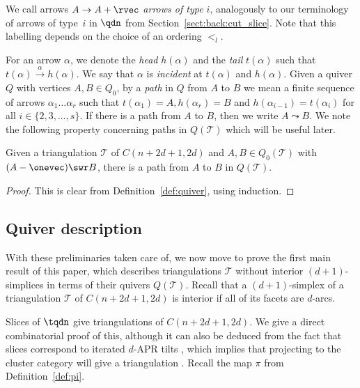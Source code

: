 We call arrows $A \to A + \rvec$ \emph{arrows of type $i$}, analogously to our terminology of arrows of type~$i$ in $\qdn$ from Section~\ref{sect:back:cut_slice}. Note that this labelling depends on the choice of an ordering $<_{l}$.

For an arrow $\alpha$, we denote the \emph{head} $h(\alpha)$ and the \emph{tail} $t(\alpha)$ such that $t(\alpha) \xrightarrow{\alpha} h(\alpha)$. We say that $\alpha$ is \emph{incident} at $t(\alpha)$ and $h(\alpha)$. Given a quiver $Q$ with vertices $A,B \in Q_{0}$, by a \emph{path} in $Q$ from $A$ to $B$ we mean a finite sequence of arrows $\alpha_{1}\dots\alpha_{r}$ such that $t(\alpha_{1}) = A, h(\alpha_{r}) = B$ and $h(\alpha_{i - 1}) = t(\alpha_{i})$ for all $i \in \{2, 3, \dots, s\}$. If there is a path from $A$ to $B$, then we write $A \leadsto B$. We note the following property concerning paths in $Q(\mathcal{T})$ which will be useful later.

\begin{lemma}\label{lem:find_path}
Given a triangulation $\mathcal{T}$ of $C(n + 2d + 1, 2d)$ and $A, B \in Q_{0}(\mathcal{T})$ with $(A - \onevec) \swr B$, there is a path from $A$ to $B$ in $Q(\mathcal{T})$.
\end{lemma}
\begin{proof}
This is clear from Definition~\ref{def:quiver}, using induction.
\end{proof}

\subsection{Quiver description}\label{sect:main}

With these preliminaries taken care of, we now move to prove the first main result of this paper, which describes triangulations $\mathcal{T}$ without interior $(d + 1)$-simplices in terms of their quivers $Q(\mathcal{T})$. Recall that a $(d + 1)$-simplex of a triangulation $\mathcal{T}$ of $C(n + 2d + 1, 2d)$ is interior if all of its facets are $d$-arcs.

Slices of $\tqdn$ give triangulations of $C(n + 2d + 1, 2d)$. We give a direct combinatorial proof of this, although it can also be deduced from the fact that slices correspond to iterated $d$-APR tilts \cite[Theorem 4.15]{io}, which implies that projecting to the cluster category will give a triangulation \cite[Theorem 6.4]{ot}. Recall the map $\pi$ from Definition~\ref{def:pi}.

